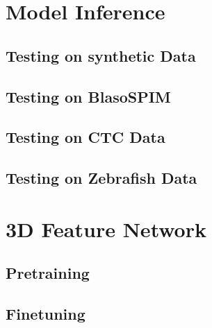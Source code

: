\section{Model Inference}

\subsection{Testing on synthetic Data}

\subsection{Testing on BlasoSPIM}

\subsection{Testing on CTC Data}

\subsection{Testing on Zebrafish Data}


\section{3D Feature Network}

\subsection{Pretraining}

\subsection{Finetuning}
